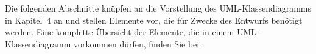 Die folgenden Abschnitte knüpfen an die Vorstellung des UML-Klassendiagramms in Kapitel~4 an und stellen Elemente vor, die für Zwecke des Entwurfs benötigt werden. Eine komplette Übersicht der Elemente, die in einem UML-Klassendiagramm vorkommen dürfen, finden Sie bei \cite[37-118]{kec18}. 

\clearpage

\clearpage

\clearpage

\clearpage

\clearpage

\clearpage

\clearpage


